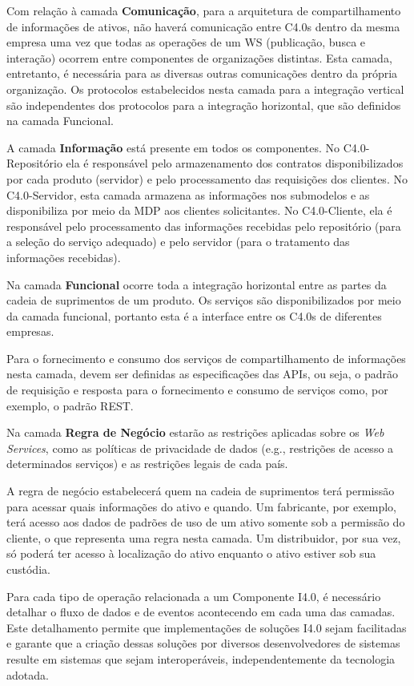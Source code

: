 Com relação à camada \textbf{Comunicação}, para a arquitetura de compartilhamento de informações de ativos, não haverá comunicação entre C4.0s dentro da mesma empresa uma vez que todas as operações de um WS (publicação, busca e interação) ocorrem entre componentes de organizações distintas. Esta camada, entretanto, é necessária para as diversas outras comunicações dentro da própria organização. Os protocolos estabelecidos nesta camada para a integração vertical são independentes dos protocolos para a integração horizontal, que são definidos na camada Funcional.

A camada \textbf{Informação} está presente em todos os componentes. No C4.0-Repositório ela é responsável pelo armazenamento dos contratos disponibilizados por cada produto (servidor) e pelo processamento das requisições dos clientes. No C4.0-Servidor, esta camada armazena as informações nos submodelos e as disponibiliza por meio da MDP aos clientes solicitantes. No C4.0-Cliente, ela é responsável pelo processamento das informações recebidas pelo repositório (para a seleção do serviço adequado) e pelo servidor (para o tratamento das informações recebidas).

Na camada \textbf{Funcional} ocorre toda a integração horizontal entre as partes da cadeia de suprimentos de um produto. Os serviços são disponibilizados por meio da camada funcional, portanto esta é a interface entre os C4.0s de diferentes empresas.

Para o fornecimento e consumo dos serviços de compartilhamento de informações nesta camada, devem ser definidas as especificações das APIs, ou seja, o padrão de requisição e resposta para o fornecimento e consumo de serviços como, por exemplo, o padrão REST.

Na camada \textbf{Regra de Negócio} estarão as restrições aplicadas sobre os \textit{Web Services}, como as políticas de privacidade de dados (e.g., restrições de acesso a determinados serviços) e as restrições legais de cada país.

A regra de negócio estabelecerá quem na cadeia de suprimentos terá permissão para acessar quais informações do ativo e quando. Um fabricante, por exemplo, terá acesso aos dados de padrões de uso de um ativo somente sob a permissão do cliente, o que representa uma regra nesta camada. Um distribuidor, por sua vez, só poderá ter acesso à localização do ativo enquanto o ativo estiver sob sua custódia.

Para cada tipo de operação relacionada a um Componente I4.0, é necessário detalhar o fluxo de dados e de eventos acontecendo em cada uma das camadas. Este detalhamento permite que implementações de soluções I4.0 sejam facilitadas e garante que a criação dessas soluções por diversos desenvolvedores de sistemas resulte em sistemas que sejam interoperáveis, independentemente da tecnologia adotada.

